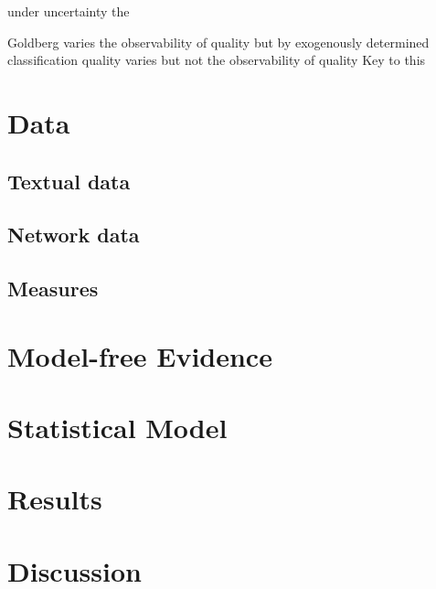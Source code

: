  under uncertainty    the 
 

Goldberg varies the observability of quality but by exogenously determined classification
quality varies but not the observability of quality
Key to this 

\section{Data}
\subsection{Textual data}
\subsection{Network data}
\subsection{Measures}
\section{Model-free Evidence}
\section{Statistical Model}
\section{Results}
\section{Discussion}